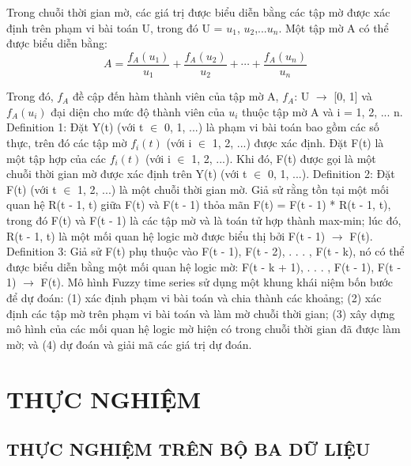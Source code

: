 \documentclass[conference]{IEEEtran}
\begin{document}
Trong chuỗi thời gian mờ, các giá trị được biểu diễn bằng các tập mờ được xác định trên phạm vi bài toán U, trong đó U = {$u_1$, $u_2$,...$u_n$}. Một tập mờ A có thể được biểu diễn bằng:
\[A = \frac{f_A(u_1)}{u_1} + \frac{f_A(u_2)}{u_2} + \cdots + \frac{f_A(u_n)}{u_n}\]

Trong đó, $f_A$ đề cập đến hàm thành viên của tập mờ A, $f_A$: U $\to$ [0, 1] và $f_A(u_i)$ đại diện cho mức độ thành viên của $u_i$ thuộc tập mờ A và i = 1, 2, ... n.
Definition 1: Đặt Y(t) (với t $\in$ 0, 1, ...) là phạm vi bài toán bao gồm các số thực, trên đó các tập mờ $f_i(t)$ (với i $\in$ 1, 2, ...) được xác định. Đặt F(t) là một tập hợp của các $f_i(t)$ (với i $\in$ 1, 2, ...). Khi đó, F(t) được gọi là một chuỗi thời gian mờ được xác định trên Y(t) (với t $\in$ 0, 1, ...).
Definition 2: Đặt F(t) (với t $\in$ 1, 2, ...) là một chuỗi thời gian mờ. Giả sử rằng tồn tại một mối quan hệ R(t - 1, t) giữa F(t) và F(t - 1) thỏa mãn F(t) = F(t - 1) * R(t - 1, t), trong đó F(t) và F(t - 1) là các tập mờ và là toán tử hợp thành max-min; lúc đó, R(t - 1, t) là một mối quan hệ logic mờ được biểu thị bởi F(t - 1) $\to$ F(t).
Definition 3: Giả sử F(t) phụ thuộc vào F(t - 1), F(t - 2), . . . , F(t - k), nó có thể được biểu diễn bằng một mối quan hệ logic mờ: F(t - k + 1), . . . , F(t - 1), F(t - 1) $\to$ F(t).
Mô hình Fuzzy time series sử dụng một khung khái niệm bốn bước để dự đoán: (1) xác định phạm vi bài toán và chia thành các khoảng; (2) xác định các tập mờ trên phạm vi bài toán và làm mờ chuỗi thời gian; (3) xây dựng mô hình của các mối quan hệ logic mờ hiện có trong chuỗi thời gian đã được làm mờ; và (4) dự đoán và giải mã các giá trị dự đoán.
\section{THỰC NGHIỆM}
\subsection{THỰC NGHIỆM TRÊN BỘ BA DỮ LIỆU}
\end{document}
